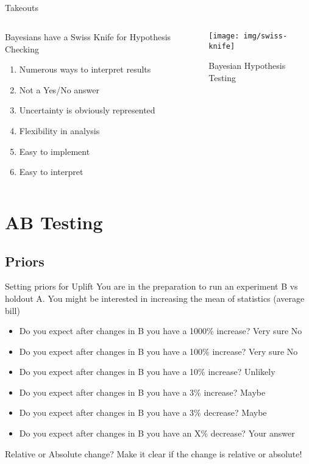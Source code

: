 \documentclass{beamer}
\begin{document}
\subsection{}
\begin{frame}{Takeouts}
\begin{columns}
    \begin{column}{0.5\linewidth}
    Bayesians have a Swiss Knife for Hypothesis Checking
    \begin{enumerate}
        \item Numerous ways to interpret results
        \item Not a Yes/No answer
        \item Uncertainty is obviously represented
        \item Flexibility in analysis
        \item Easy to implement
        \item Easy to interpret
    \end{enumerate}
    \end{column}
    \begin{column}{0.5\linewidth}
    \begin{figure}
        \centering
        \texttt{[image: img/swiss-knife]}
        \caption{Bayesian Hypothesis Testing}
    \end{figure}
    \end{column}
\end{columns}
\section{AB Testing}
\end{frame}
\subsection{Priors}
\begin{frame}{Setting priors for Uplift}
You are in the preparation to run an experiment B vs holdout A. You might be interested in increasing the mean of statistics (average bill)
\begin{itemize}
\pause
\item<+-> Do you expect after changes in B you have a 1000\% increase? Very sure No
\item<+-> Do you expect after changes in B you have a 100\% increase? Very sure No
\item<+-> Do you expect after changes in B you have a 10\% increase? Unlikely
\item<+-> Do you expect after changes in B you have a 3\% increase? Maybe
\item<+-> Do you expect after changes in B you have a 3\% decrease? Maybe
\item<+-> Do you expect after changes in B you have an X\% decrease? Your answer
\end{itemize}
\begin{alertblock}{Relative or Absolute change?}
    Make it clear if the change is relative or absolute!
\end{alertblock}
\end{frame}
\end{document}
